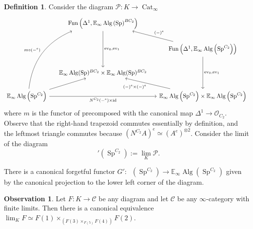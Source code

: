 \documentclass{article}
\DeclareMathOperator{\Alg}{Alg}
\DeclareMathOperator{\CAlgp}{CAlg^p} %
\DeclareMathOperator{\Cat}{Cat} %
\DeclareMathOperator{\Fun}{Fun} %
\DeclareMathOperator{\id}{id} %
\DeclareMathOperator{\Spectra}{Sp} %
\newcommand{\EE}{\mathbb{E}}
\theoremstyle{definition}
\newtheorem{definition}[equation]{Definition}
\newtheorem{observation}[equation]{Observation}
\begin{document}
\begin{definition}\label{defn:calgp_alt_diagram}
    Consider the diagram $ \mathcal{P} \colon K \to \Cat_\infty $ 
    \begin{equation}%
    \begin{tikzcd}[column sep=small]
        & \Fun\left(\Delta^1,\EE_\infty\Alg\left(\Spectra\right)^{BC_2}\right) \ar[dd,"{\mathrm{ev}_{0},\mathrm{ev}_{1}}"]  & \\
        & & \Fun\left(\Delta^1,\EE_\infty\Alg\left(\Spectra^{C_2}\right)\right) \ar[dd,"{\mathrm{ev}_{0}, \mathrm{ev}_{1}}"] \ar[lu,"{(-)^e}"'] \\
        &\EE_\infty\Alg(\Spectra)^{BC_2} \times \EE_\infty\Alg(\Spectra)^{BC_2} & \\
        \EE_\infty\Alg\left(\Spectra^{C_2}\right)  \ar[rr,"{N^{C_2}(-^e) \times \id}"'] \ar[ru] \ar[ruuu,"{m \circ (-^e)}", bend left=30] & &\EE_\infty\Alg\left(\Spectra^{C_2}\right) \times \EE_\infty\Alg\left(\Spectra^{C_2}\right) \ar[lu,"{(-)^e \times (-)^e}"]
    \end{tikzcd}
    \end{equation}
    where $ m $ is the functor of \cite[Construction 3.1]{LYang_normedrings} precomposed with the canonical map $ \Delta^1 \to \mathcal{O}_{C_2} $. 
    Observe that the right-hand trapezoid commutes essentially by definition, and the leftmost triangle commutes because $ \left(N^{C_2} A \right)^e \simeq (A^e)^{\otimes 2} $. 
    Consider the limit of the diagram 
    \begin{equation}
        \CAlgp'\left(\Spectra^{C_2}\right) := \lim_K \mathcal{P} .
    \end{equation} 

    There is a canonical forgetful functor $ G' \colon \CAlgp\left(\Spectra^{C_2}\right) \to \EE_\infty\Alg\left(\Spectra^{C_2}\right)  $ given by the canonical projection to the lower left corner of the diagram. 
\end{definition}
\begin{observation}\label{obs:limits_of_limits}
    Let $ F \colon K \to \mathcal{C} $ be any diagram and let $ \mathcal{C} $ be any $ \infty $-category with finite limits. 
    Then there is a canonical equivalence $ \displaystyle \lim_K F \simeq F(1) \times_{\left(F(3) \times_{F(5)} F(4)\right)} F(2) $. 
\end{observation}
\end{document}
